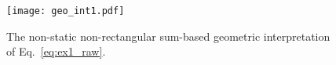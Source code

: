 \documentclass[twoside,reqno,11pt]{fcaa-var} %
\begin{document}
\begin{figure}[htb]
\centering
\texttt{[image: geo\_int1.pdf]}
\caption{The non-static non-rectangular sum-based geometric interpretation of Eq.~\eqref{eq:ex1_raw}.}
\label{fig:geo1}
\end{figure}


\end{document}
